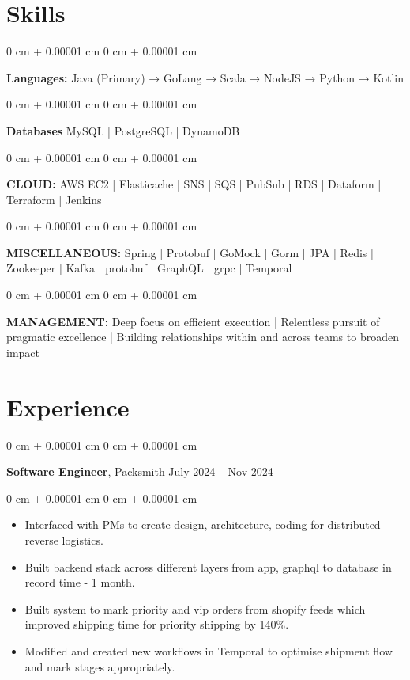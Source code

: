 \documentclass[10pt, letterpaper]{article}
\newenvironment{highlights}{
    \begin{itemize}[
        topsep=0.10 cm,
        parsep=0.10 cm,
        partopsep=0pt,
        itemsep=0pt,
        leftmargin=0 cm + 10pt
    ]
}{
    \end{itemize}
} %
\newenvironment{onecolentry}{
    \begin{adjustwidth}{
        0 cm + 0.00001 cm
    }{
        0 cm + 0.00001 cm
    }
}{
    \end{adjustwidth}
} %
\newenvironment{twocolentry}[2][]{
    \onecolentry
    \def\secondColumn{#2}
    \setcolumnwidth{\fill, 4.5 cm}
    \begin{paracol}{2}
}{
    \switchcolumn \raggedleft \secondColumn
    \end{paracol}
    \endonecolentry
} %
\begin{document}
    \section{Skills}
        \begin{onecolentry}
            \textbf{Languages:} Java (Primary) → GoLang → Scala → NodeJS → Python → Kotlin
        \end{onecolentry}
        \begin{onecolentry}
            \textbf{Databases} MySQL | PostgreSQL | DynamoDB
        \end{onecolentry}
        \begin{onecolentry}
            \textbf{CLOUD:} AWS EC2 | Elasticache | SNS | SQS | PubSub | RDS | Dataform | Terraform | Jenkins
        \end{onecolentry}
        \begin{onecolentry}
            \textbf{MISCELLANEOUS:} Spring | Protobuf | GoMock | Gorm | JPA | Redis | Zookeeper | Kafka | protobuf | GraphQL | grpc | Temporal
        \end{onecolentry}
        \begin{onecolentry}
            \textbf{MANAGEMENT:} Deep focus on efficient execution | Relentless pursuit of pragmatic excellence | Building relationships within and across teams to broaden impact
        \end{onecolentry}
    
    \section{Experience}
        \vspace{0.15 cm}
        \begin{twocolentry}{
            July 2024 – Nov 2024
        }
            \textbf{Software Engineer}, Packsmith\end{twocolentry}

        \vspace{0.10 cm}
        \begin{onecolentry}
            \begin{highlights}
                \item Interfaced with PMs to create design, architecture, coding for distributed reverse logistics.
                \item Built backend stack across different layers from app, graphql to database in record time - 1 month.
                \item Built system to mark priority and vip orders from shopify feeds which improved shipping time for priority shipping by 140\%.
                \item Modified and created new workflows in Temporal to optimise shipment flow and mark stages appropriately.
            \end{highlights}
        \end{onecolentry}
        
\end{document}
